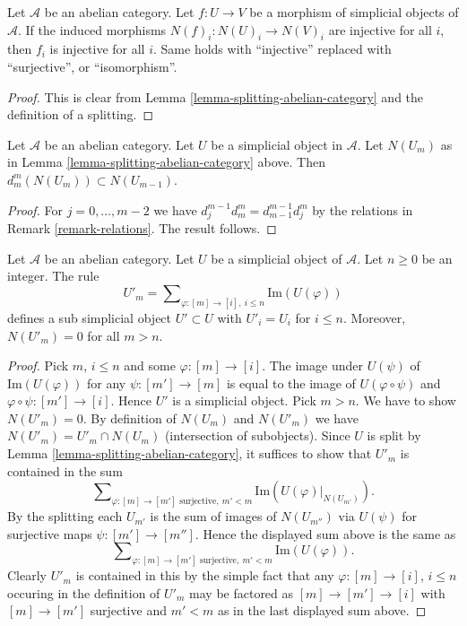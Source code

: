 \begin{lemma}
\label{lemma-injective-map-simplicial-abelian}
Let $\mathcal{A}$ be an abelian category.
Let $f : U \to V$ be a morphism of
simplicial objects of $\mathcal{A}$.
If the induced morphisms $N(f)_i : N(U)_i \to N(V)_i$
are injective for all $i$, then $f_i$ is
injective for all $i$. Same holds with ``injective'' replaced
with ``surjective'', or ``isomorphism''.
\end{lemma}

\begin{proof}
This is clear from Lemma \ref{lemma-splitting-abelian-category}
and the definition of a splitting.
\end{proof}


\begin{lemma}
\label{lemma-N-d-in-N}
Let $\mathcal{A}$ be an abelian category.
Let $U$ be a simplicial object in $\mathcal{A}$.
Let $N(U_m)$ as in Lemma \ref{lemma-splitting-abelian-category} above.
Then $d^m_m(N(U_m)) \subset N(U_{m - 1})$.
\end{lemma}

\begin{proof}
For $j = 0, \ldots, m - 2$ we have
$d^{m - 1}_j d^m_m = d^{m - 1}_{m - 1} d^m_j$
by the relations in Remark \ref{remark-relations}.
The result follows.
\end{proof}

\begin{lemma}
\label{lemma-simplicial-abelian-n-skel-sub}
Let $\mathcal{A}$ be an abelian category.
Let $U$ be a simplicial object of $\mathcal{A}$.
Let $n \geq 0$ be an integer.
The rule
$$
U'_m = \sum\nolimits_{\varphi : [m] \to [i],\ i\leq n} \text{Im}(U(\varphi))
$$
defines a sub simplicial object $U' \subset U$ with $U'_i = U_i$
for $i \leq n$.
Moreover, $N(U'_m) = 0$ for all $m > n$.
\end{lemma}

\begin{proof}
Pick $m$, $i \leq n$ and some $\varphi : [m] \to [i]$.
The image under $U(\psi)$ of $\text{Im}(U(\varphi))$
for any $\psi : [m'] \to [m]$ is
equal to the image of $U(\varphi \circ \psi)$ and
$\varphi \circ \psi : [m'] \to [i]$.
Hence $U'$ is a simplicial object.
Pick $m > n$. We have to show $N(U'_m) = 0$.
By definition of $N(U_m)$ and $N(U'_m)$ we have
$N(U'_m) = U'_m \cap N(U_m)$ (intersection of subobjects).
Since $U$ is split by Lemma \ref{lemma-splitting-abelian-category},
it suffices to show that $U'_m$ is contained in the sum
$$
\sum\nolimits_{\varphi : [m] \to [m']\text{ surjective},\ m' < m}
\text{Im}(U(\varphi)|_{N(U_{m'})}).
$$
By the splitting each $U_{m'}$ is the sum of images of
$N(U_{m''})$ via $U(\psi)$ for surjective maps
$\psi : [m'] \to [m'']$. Hence the displayed sum above
is the same as
$$
\sum\nolimits_{\varphi : [m] \to [m']\text{ surjective},\ m' < m}
\text{Im}(U(\varphi)).
$$
Clearly $U'_m$ is contained in this by the simple fact that
any $\varphi : [m] \to [i]$, $i \leq n$ occuring in the definition
of $U'_m$ may be factored as
$[m] \to [m'] \to [i]$ with $[m] \to [m']$ surjective
and $m' < m$ as in the last displayed sum above.
\end{proof}



